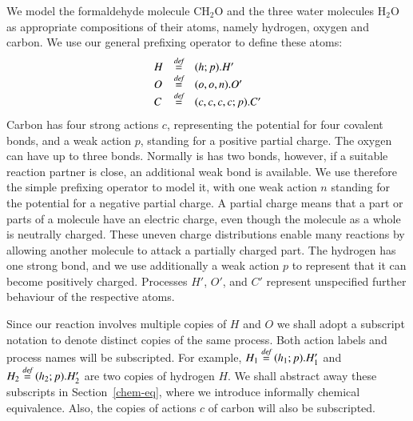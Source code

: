 We model the formaldehyde molecule $\mathrm{CH_2O}$ and the three water molecules $\mathrm{H_2O}$
as appropriate compositions of their atoms, namely hydrogen, oxygen and carbon. We use our 
general prefixing operator to define these atoms: 
$$\begin{array}{lll}
H & \stackrel{\emph{def}}{=} & (h;p).H'\\
O & \stackrel{\emph{def}}{=} & (o,o,n).O'\\
C & \stackrel{\emph{def}}{=} & (c,c,c,c;p).C'
\end{array}$$
Carbon has four strong actions $c$, representing the potential for four covalent bonds, and 
a weak action $p$, standing for a positive partial charge. 
The oxygen can have up to three bonds. Normally is has two bonds, however, if a suitable reaction 
partner is close, an additional weak bond is available. We use therefore the simple prefixing operator
to model it, with one weak action $n$ standing for the potential for a negative partial charge. 
A partial charge means that a part or parts of a molecule have an electric charge, even though 
the molecule as a whole is neutrally charged. These uneven charge distributions enable 
many reactions by allowing another molecule to attack a partially charged part.
The hydrogen has one strong bond, and we use additionally a weak action $p$ to represent 
that it can become positively charged. Processes $H'$, $O'$, and $C'$ represent 
unspecified further behaviour of the respective atoms.

Since our reaction involves multiple copies of $H$ and $O$ we shall adopt a subscript notation 
to denote distinct copies of the same process. Both action labels and process names will be
subscripted. For example, $H_1\stackrel{\emph{def}}{=} (h_1;p).H_1'$ and $H_2\stackrel{\emph{def}}{=} (h_2;p).H_2'$ are two copies
of hydrogen $H$. 
We shall abstract away these subscripts in Section~\ref{chem-eq}, where we introduce
informally chemical equivalence.  
Also, the copies of actions $c$ of carbon will also be subscripted.


